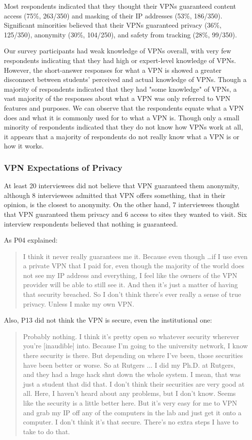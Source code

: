 Most respondents indicated that they thought their VPNs guaranteed content
access (75\%, 263/350) and masking of their IP addresses (53\%, 186/350).
Significant minorities believed that their VPNs guaranteed privacy (36\%,
125/350), anonymity (30\%, 104/250), and safety from tracking (28\%, 99/350).

Our survey participants had weak knowledge of VPNs overall, with very few
respondents indicating that they had high or expert-level knowledge of VPNs.
However, the short-answer responses for what a VPN is showed a greater
disconnect between students’ perceived and actual knowledge of VPNs. Though a
majority of respondents indicated that they had "some knowledge" of VPNs, a
vast majority of the responses about what a VPN was only referred to VPN
features and purposes. We can observe that the respondents equate what a VPN
does and what it is commonly used for to what a VPN is. Though only a small
minority of respondents indicated that they do not know how VPNs work at all,
it appears that a majority of respondents do not really know what a VPN is or
how it works.


\subsubsection{VPN Expectations of Privacy} At least 20 interviewees did not
believe that VPN guaranteed them anonymity, although 8 interviewees admitted
that VPN offers something, that in their opinion, is the closest to anonymity.
On the other hand, 7 interviewees thought that VPN guaranteed them privacy and
6 access to sites they wanted to visit. Six interview respondents believed
that nothing is guaranteed.

As P04 explained: \begin{quote}I think it never really guarantees me it.
Because even though \dots if I use even a private VPN that I paid for, even
though the majority of the world does not see my IP address and everything, I
feel like the owners of the VPN provider will be able to still see it. And
then it's just a matter of having that security breached. So I don't think
there's ever really a sense of true privacy. Unless I make my own
VPN.\end{quote}


Also, P13 did not think the VPN is secure, even the institutional one:
\begin{quote}Probably nothing. I think it's pretty open so whatever security
wherever you're [inaudible] into. Because I'm going to the university network,
I know there security is there. But depending on where I've been, those
securities have been better or worse. So at Rutgers ... I did my Ph.D. at
Rutgers, and they had a huge hack shut down the whole system. I mean, that was
just a student that did that. I don't think their securities are very good at
all. Here, I haven't heard about any problems, but I don't know. Seems like
the security is a little better here. But it's very easy for me to VPN and
grab my IP off any of the computers in the lab and just get it onto a
computer. I don't think it's that secure. There's no extra steps I have to
take to do that.\end{quote}


